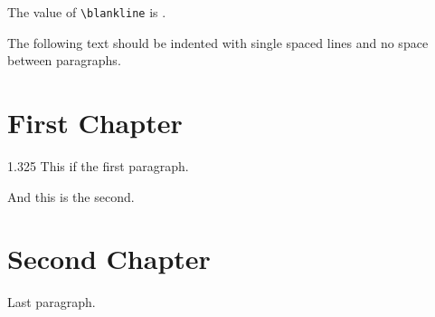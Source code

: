 \documentclass[
    fontsize=11,
    paper=letter,
    usegeometry=true  %
  ]{scrreprt}
\renewcommand{\indent}{\hspace{0.5in}}
\newlength{\blankline}
\begin{document}
The value of \verb|\blankline| is \texttt{\the\blankline}.

The following text should be indented with single spaced lines and no space between paragraphs.

\lipsum[1-2]

\tableofcontents

\chapter{First Chapter}
\begin{spacing}{1.325}
\indent
This if the first paragraph.
\lipsum[][1-3]

And this is the second.
\lipsum[][4-6]
\end{spacing}

\chapter{Second Chapter}
Last paragraph.

\lipsum[][7-9]
\end{document}
